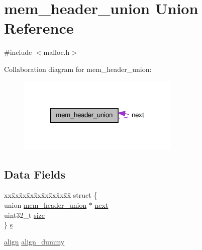 \hypertarget{unionmem__header__union}{\section{mem\-\_\-header\-\_\-union Union Reference}
\label{unionmem__header__union}
}


{\ttfamily \#include $<$malloc.\-h$>$}



Collaboration diagram for mem\-\_\-header\-\_\-union\-:\nopagebreak
\begin{figure}[H]
\begin{center}
\leavevmode
\includegraphics[width=220pt]{unionmem__header__union__coll__graph}
\end{center}
\end{figure}
\subsection*{Data Fields}
\begin{DoxyCompactItemize}
\item 
\begin{tabbing}
xx\=xx\=xx\=xx\=xx\=xx\=xx\=xx\=xx\=\kill
struct \{\\
\>union \hyperlink{unionmem__header__union}{mem\_header\_union} $\ast$ \hyperlink{unionmem__header__union_a22eb41be35488312c1e42462d5679d64}{next}\\
\>uint32\_t \hyperlink{unionmem__header__union_ab0a6578a8d52fd76a933d21273e73e08}{size}\\
\} \hyperlink{unionmem__header__union_a8e9bc77f2cf7596a7503f50ef29019f9}{s}\\

\end{tabbing}\item 
\hyperlink{malloc_8h_a1e0a98b5055eebe08414396335357f7f}{align} \hyperlink{unionmem__header__union_a5ca4f0da25cd2b76029162df7bdb537c}{align\-\_\-dummy}
\end{DoxyCompactItemize}


